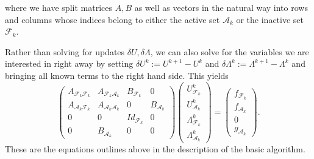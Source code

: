 \documentclass{article}
\begin{document}
where we have split matrices $A,B$ as well as vectors in the natural way into
rows and columns whose indices belong to either the active set
${\mathcal{A}_k}$ or the inactive set ${\mathcal{F}_k}$.

Rather than solving for updates $\delta U, \delta \Lambda$, we can also solve
for the variables we are interested in right away by setting $\delta U^k :=
U^{k+1} - U^k$ and $\delta \Lambda^k := \Lambda^{k+1} - \Lambda^k$ and
bringing all known terms to the right hand side. This yields
\begin{equation*}
\begin{pmatrix}
 A_{\mathcal{F}_k\mathcal{F}_k} & A_{\mathcal{F}_k\mathcal{A}_k} & B_{\mathcal{F}_k} & 0\\
 A_{\mathcal{A}_k\mathcal{F}_k} & A_{\mathcal{A}_k\mathcal{A}_k} & 0 & B_{\mathcal{A}_k}\\
 0 & 0 & Id_{\mathcal{F}_k} & 0\\
 0 & B_{\mathcal{A}_k} & 0 & 0
\end{pmatrix}
\begin{pmatrix}
 U^k_{\mathcal{F}_k}\\ U^k_{\mathcal{A}_k}\\ \Lambda^k_{\mathcal{F}_k}\\ \Lambda^k_{\mathcal{A}_k}
\end{pmatrix}
=
\begin{pmatrix}
 f_{\mathcal{F}_k}\\ f_{\mathcal{A}_k}\\ 0\\ g_{\mathcal{A}_k}
\end{pmatrix}.
\end{equation*}
These are the equations outlines above in the description of the basic algorithm.
\end{document}
